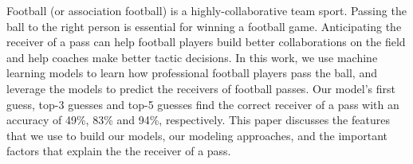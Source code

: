 Football (or association football) is a highly-collaborative team sport. 
Passing the ball to the right person is essential for winning a football game.
Anticipating the receiver of a pass can help football players build better collaborations on the field and help coaches make better tactic decisions.
In this work, we use machine learning models to learn how professional football players pass the ball, and leverage the models to predict the receivers of football passes.
Our model's first guess, top-3 guesses and top-5 guesses find the correct receiver of a pass with an accuracy of 49\%, 83\% and 94\%, respectively.
This paper discusses the features that we use to build our models, our modeling approaches, and the important factors that explain the the receiver of a pass.
